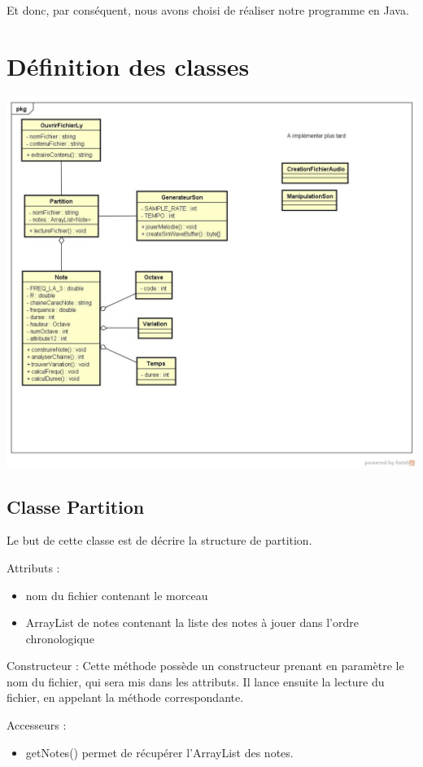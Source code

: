 \documentclass{EPUProjetPeiP}
\begin{document}
Et donc, par conséquent, nous avons choisi de réaliser notre programme en Java.

\section{Définition des classes}

\includegraphics[scale=0.4]{Class_Diagram_MusicalSynth.jpg}
\label{fig1}
\subsection{Classe Partition}

Le but de cette classe est de décrire la structure de partition.

Attributs :
\begin{itemize}
\item nom du fichier contenant le morceau
\item ArrayList de notes contenant la liste des notes à jouer dans l'ordre chronologique
\end{itemize}

Constructeur :
Cette méthode possède un constructeur prenant en paramètre le nom du fichier, qui sera mis dans les attributs.
Il lance ensuite la lecture du fichier, en appelant la méthode correspondante.

Accesseurs :
\begin{itemize}
\item getNotes() permet de récupérer l'ArrayList des notes.
\end{itemize}
\end{document}
